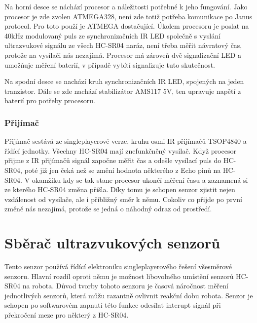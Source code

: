 Na horní desce se náchází procesor a náležitosti potřebné k jeho fungování.
Jako procesor je zde zvolen ATMEGA328, není zde totiž potřeba komunikace po Janus protocol.
Pro toto použí je ATMEGA dostačující.
Úkolem procesoru je poslat na 40kHz modulovaný puls ze synchronizačních IR LED společně s vyslání ultrazvukové signálu ze všech HC-SR04 naráz, není třeba měřit návratový čas, protože na vysílači nás nezajímá.
Procesor má zároveň dvě signalizační LED a umožňuje měření baterií, v případě vybítí signalizuje tuto skutečnost.

Na spodní desce se nachází kruh synchronizačních IR LED, spojených na jeden tranzistor.
Dále se zde nachází stabilizátor AMS117 5V, ten upravuje napětí z baterií pro potřeby procesoru.

\subsubsection{Přijímač}
Přijímač sestává ze singleplayerové verze, kruhu osmi IR přijímačů TSOP4840 a řídící jednotky.
Všechny HC-SR04 mají znefunkčněný vysílač.
Když procesor přijme z IR přijímačů signál započne měřit čas a odešle vysílací puls do HC-SR04, poté již jen čeká než se změní hodnota některého z Echo pinů na HC-SR04.
V okamžiku kdy se tak stane procesor ukončí měření času a zaznamená si ze kterého HC-SR04 změna přišla.
Díky tomu je schopen senzor zjistit nejen vzdálenost od vysílače, ale i přibližný směr k němu.
Cokoliv co přijde po první změně nás nezajímá, protože se jedná o náhodný odraz od prostředí.

\section{Sběrač ultrazvukových senzorů}
Tento senzor používá řídící elektroniku singleplayerového řešení všesměrové senzoru.
Hlavní rozdíl oproti němu je možnost libovolného umístění senzorů HC-SR04 na robota.
Důvod tvorby tohoto senzoru je časová náročnost měření jednotlivých senzorů, která můžu razantně ovlivnit reakční dobu robota.
Senzor je schopen po softwarovém zapnutí této funkce odesílat interupt signál při překročení meze pro některý z HC-SR04.